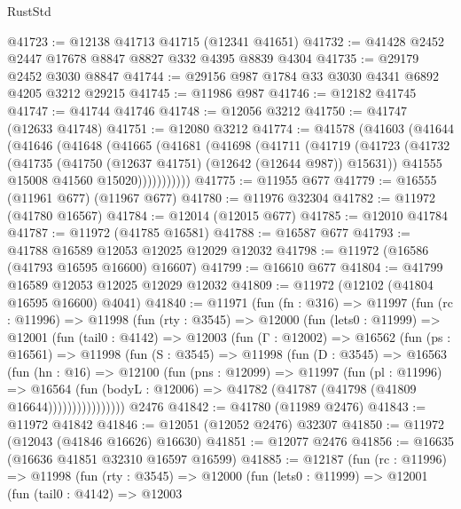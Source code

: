 \begin{lexlean}{RustStd}
\begin{coremodule}
@41723 := @12138 @41713 @41715 (@12341 @41651)
@41732 := @41428 @2452 @2447 @17678 @8847 @8827 @332 @4395 @8839 @4304
@41735 := @29179 @2452 @3030 @8847
@41744 := @29156 @987 @1784 @33 @3030 @4341 @6892 @4205 @3212 @29215
@41745 := @11986 @987
@41746 := @12182 @41745
@41747 := @41744 @41746
@41748 := @12056 @3212
@41750 := @41747 (@12633 @41748)
@41751 := @12080 @3212
@41774 := @41578
    (@41603
      (@41644
        (@41646
          (@41648
            (@41665
              (@41681
                (@41698
                  (@41711
                    (@41719
                      (@41723
                        (@41732
                          (@41735 (@41750 (@12637 @41751) (@12642 (@12644 @987)) @15631))
                          @41555
                          @15008
                          @41560
                          @15020)))))))))))
@41775 := @11955 @677
@41779 := @16555 (@11961 @677) (@11967 @677)
@41780 := @11976 @32304
@41782 := @11972 (@41780 @16567)
@41784 := @12014 (@12015 @677)
@41785 := @12010 @41784
@41787 := @11972 (@41785 @16581)
@41788 := @16587 @677
@41793 := @41788 @16589 @12053 @12025 @12029 @12032
@41798 := @11972 (@16586 (@41793 @16595 @16600) @16607)
@41799 := @16610 @677
@41804 := @41799 @16589 @12053 @12025 @12029 @12032
@41809 := @11972 (@12102 (@41804 @16595 @16600) @4041)
@41840 := @11971
    (fun (fn : @316) =>
    @11997
      (fun (rc : @11996) =>
      @11998
        (fun (rty : @3545) =>
        @12000
          (fun (lets0 : @11999) =>
          @12001
            (fun (tail0 : @4142) =>
            @12003
              (fun (Γ : @12002) =>
              @16562
                (fun (ps : @16561) =>
                @11998
                  (fun (S : @3545) =>
                  @11998
                    (fun (D : @3545) =>
                    @16563
                      (fun (hn : @16) =>
                      @12100
                        (fun (pns : @12099) =>
                        @11997
                          (fun (pl : @11996) =>
                          @16564
                            (fun (bodyL : @12006) =>
                            @41782 (@41787 (@41798 (@41809 @16644))))))))))))))))
    @2476
@41842 := @41780 (@11989 @2476)
@41843 := @11972 @41842
@41846 := @12051 (@12052 @2476) @32307
@41850 := @11972 (@12043 (@41846 @16626) @16630)
@41851 := @12077 @2476
@41856 := @16635 (@16636 @41851 @32310 @16597 @16599)
@41885 := @12187
    (fun (rc : @11996) =>
    @11998
      (fun (rty : @3545) =>
      @12000
        (fun (lets0 : @11999) =>
        @12001
          (fun (tail0 : @4142) =>
          @12003

\end{coremodule}
\end{lexlean}

